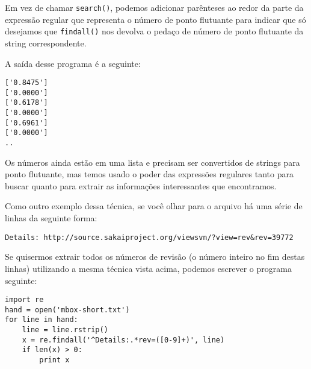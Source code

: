 Em vez de chamar {\tt search()}, podemos adicionar parênteses ao redor da parte da expressão 
regular que representa o número de ponto flutuante para indicar que só desejamos que 
{\tt findall()} nos devolva o pedaço de número de ponto flutuante da string correspondente.

A saída desse programa é a seguinte:

\beforeverb
\begin{verbatim}
['0.8475']
['0.0000']
['0.6178']
['0.0000']
['0.6961']
['0.0000']
..
\end{verbatim}
\afterverb
%

Os números ainda estão em uma lista e precisam ser convertidos de strings para ponto flutuante, 
mas temos usado o poder das expressões regulares tanto para buscar quanto para extrair as 
informações interessantes que encontramos.

Como outro exemplo dessa técnica, se você olhar para o arquivo há uma série de linhas da seguinte 
forma:

\beforeverb
\begin{verbatim}
Details: http://source.sakaiproject.org/viewsvn/?view=rev&rev=39772
\end{verbatim}
\afterverb
%

Se quisermos extrair todos os números de revisão (o número inteiro no fim destas linhas)
utilizando a mesma técnica vista acima, podemos escrever o programa seguinte:

\beforeverb
\begin{verbatim}
import re
hand = open('mbox-short.txt')
for line in hand:
    line = line.rstrip()
    x = re.findall('^Details:.*rev=([0-9]+)', line)
    if len(x) > 0:
        print x
\end{verbatim}
\afterverb
%


